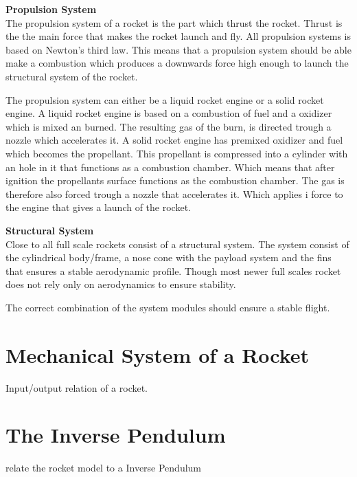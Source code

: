 \textbf{Propulsion System}\\
The propulsion system of a rocket is the part which thrust the rocket. Thrust is the the main force that makes the rocket launch and fly. All propulsion systems is based on Newton's third law. This means that a propulsion system should be able make a combustion which produces a downwards force high enough to launch the structural system of the rocket.


The propulsion system can either be a liquid rocket engine or a solid rocket engine. A liquid rocket engine is based on a combustion of fuel and a oxidizer which is mixed an burned. The resulting gas of the burn, is directed trough a nozzle which accelerates it.
A solid rocket engine has premixed oxidizer and fuel which becomes the propellant. This propellant is compressed into a cylinder with an hole in it that functions as a combustion chamber. Which means that after ignition the propellants surface functions as the combustion chamber. The gas is therefore also forced trough a nozzle that accelerates it. Which applies i force to the engine that gives a launch of the rocket. 


\textbf{Structural System}\\
Close to all full scale rockets consist of a structural system. The system consist of the cylindrical body/frame, a nose cone with the payload system and the fins that ensures a stable aerodynamic profile. Though most newer full scales rocket does not rely only on aerodynamics to ensure stability\cite{web:RocketStructure}.
\bigbreak   

The correct combination of the system modules should ensure a stable flight.  



\section{Mechanical System of a Rocket}
Input/output relation of a rocket.

\section{The Inverse Pendulum}
relate the rocket model to a Inverse Pendulum